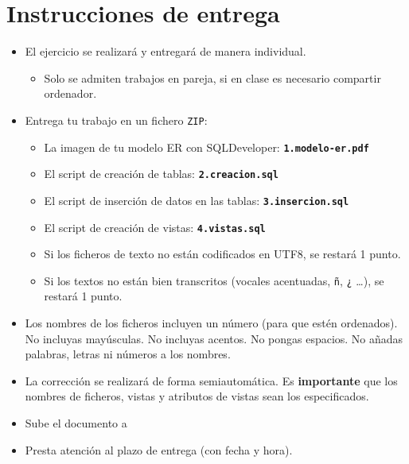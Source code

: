 \section{Instrucciones de entrega}
\begin{itemize}
\item El ejercicio se realizará y entregará de manera individual.
  \begin{itemize}
  \item Solo se admiten trabajos en pareja, si en clase es necesario compartir ordenador.
  \end{itemize}
\item Entrega tu trabajo en un fichero \texttt{ZIP}:
  \begin{itemize}
  \item La imagen de tu modelo ER  con SQLDeveloper: \texttt{\textbf{1.modelo-er.pdf}}
  \item El script de creación de tablas: \texttt{\textbf{2.creacion.sql}}
  \item El script de inserción de datos en las tablas: \texttt{\textbf{3.insercion.sql}}
  \item El script de creación de vistas: \texttt{\textbf{4.vistas.sql}}
  \item Si los ficheros de texto no están codificados en UTF8, se restará 1 punto.
  \item Si los textos no están bien transcritos (vocales acentuadas, \texttt{ñ}, \texttt{¿} \ldots), se restará 1 punto.
  \end{itemize}
\item Los nombres de los ficheros incluyen un número (para que estén ordenados). No incluyas mayúsculas. No incluyas acentos. No pongas espacios. No añadas palabras, letras ni números a los nombres.
  \item La corrección se realizará de forma semiautomática. Es \textbf{importante} que los nombres de ficheros, vistas y atributos de vistas sean los especificados.
\item Sube el documento a 
\item Presta atención al plazo de entrega (con fecha y hora).
  
\end{itemize}





